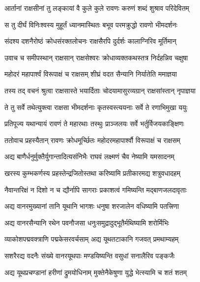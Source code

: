 
\twolineshloka
{आर्तानां राक्षसीनां तु लङ्कायां वै कुले कुले}
{रावणः करुणं शब्दं शुश्राव परिदेवितम्} %

\twolineshloka
{स तु दीर्घं विनिःश्वस्य मुहूर्तं ध्यानमास्थितः}
{बभूव परमक्रुद्धो रावणो भीमदर्शनः} %

\twolineshloka
{संदश्य दशनैरोष्ठं क्रोधसंरक्तलोचनः}
{राक्षसैरपि दुर्दर्शः कालाग्निरिव मूर्तिमान्} %

\twolineshloka
{उवाच च समीपस्थान् राक्षसान् राक्षसेश्वरः}
{क्रोधाव्यक्तकथस्तत्र निर्दहन्निव चक्षुषा} %

\twolineshloka
{महोदरं महापार्श्वं विरूपाक्षं च राक्षसम्}
{शीघ्रं वदत सैन्यानि निर्यातेति ममाज्ञया} %

\twolineshloka
{तस्य तद् वचनं श्रुत्वा राक्षसास्ते भयार्दिताः}
{चोदयामासुरव्यग्रान् राक्षसांस्तान् नृपाज्ञया} %

\twolineshloka
{ते तु सर्वे तथेत्युक्त्वा राक्षसा भीमदर्शनाः}
{कृतस्वस्त्ययनाः सर्वे ते रणाभिमुखा ययुः} %

\twolineshloka
{प्रतिपूज्य यथान्यायं रावणं ते महारथाः}
{तस्थुः प्राञ्जलयः सर्वे भर्तुर्विजयकाङ्क्षिणः} %

\twolineshloka
{ततोवाच प्रहस्यैतान् रावणः क्रोधमूर्च्छितः}
{महोदरमहापार्श्वौ विरूपाक्षं च राक्षसम्} %

\twolineshloka
{अद्य बाणैर्धनुर्मुक्तैर्युगान्तादित्यसंनिभैः}
{राघवं लक्ष्मणं चैव नेष्यामि यमसादनम्} %

\twolineshloka
{खरस्य कुम्भकर्णस्य प्रहस्तेन्द्रजितोस्तथा}
{करिष्यामि प्रतीकारमद्य शत्रुवधादहम्} %

\twolineshloka
{नैवान्तरिक्षं न दिशो न च द्यौर्नापि सागराः}
{प्रकाशत्वं गमिष्यन्ति मद्बाणजलदावृताः} %

\twolineshloka
{अद्य वानरमुख्यानां तानि यूथानि भागशः}
{धनुषा शरजालेन वधिष्यामि पतत्त्रिणा} %

\twolineshloka
{अद्य वानरसैन्यानि रथेन पवनौजसा}
{धनुःसमुद्रादुद्भूतैर्मथिष्यामि शरोर्मिभिः} %

\twolineshloka
{व्याकोशपद्मवक्त्राणि पद्मकेसरवर्चसाम्}
{अद्य यूथतटाकानि गजवत् प्रमथाम्यहम्} %

\twolineshloka
{सशरैरद्य वदनैः संख्ये वानरयूथपाः}
{मण्डयिष्यन्ति वसुधां सनालैरिव पङ्कजैः} %

\twolineshloka
{अद्य यूथप्रचण्डानां हरीणां द्रुमयोधिनाम्}
{मुक्तेनैकेषुणा युद्धे भेत्स्यामि च शतं शतम्} %

